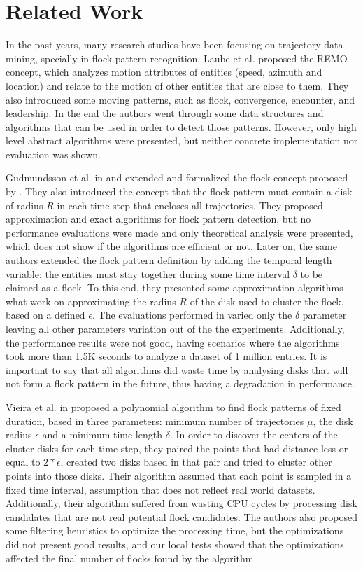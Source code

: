 \chapter{Related Work}
\label{chp:relatedwork}
In the past years, many research studies have been focusing on trajectory data mining, specially in flock pattern
recognition. Laube et al. \cite{bib:remo} proposed the REMO concept, which analyzes motion attributes of entities
(speed, azimuth and location) and relate to the motion of other entities that are close to them. They also introduced
some moving patterns, such as flock, convergence, encounter, and leadership. In the end the authors went through some
data structures and algorithms that can be used in order to detect those patterns. However, only high level abstract
algorithms were presented, but neither concrete implementation nor evaluation was shown.

Gudmundsson et al. in \cite{bib:gudefficient} and \cite{bib:gudlongest} extended and formalized the flock concept
proposed by \cite{bib:remo}. They also introduced the concept that the flock pattern must contain a disk of radius $R$
in each time step that encloses all trajectories. They proposed approximation and exact algorithms for flock pattern
detection, but no performance evaluations were made and only theoretical analysis were presented, which does not show if
the algorithms are efficient or not. Later on, the same authors \cite{bib:gudlongest} extended the flock pattern
definition by adding the temporal length variable: the entities must stay together during some time interval $\delta$ to
be claimed as a flock. To this end, they presented some approximation algorithms what work on approximating the radius
$R$ of the disk used to cluster the flock, based on a defined $\epsilon$. The evaluations performed in
\cite{bib:gudlongest} varied only the $\delta$ parameter leaving all other parameters variation out of the the
experiments. Additionally, the performance results were not good, having scenarios where the algorithms took more than
1.5K seconds to analyze a dataset of 1 million entries. It is important to say that all algorithms did waste time by
analysing disks that will not form a flock pattern in the future, thus having a degradation in performance.

Vieira et al. in \cite{bib:vieira} proposed a polynomial algorithm to find flock patterns of fixed duration, based in
three parameters: minimum number of trajectories $\mu$, the disk radius $\epsilon$ and a minimum time length $\delta$.
In order to discover the centers of the cluster disks for each time step, they paired the points that had distance less
or equal to $2*\epsilon$, created two disks based in that pair and tried to cluster other points into those disks. Their
algorithm assumed that each point is sampled in a fixed time interval, assumption that does not reflect real world
datasets. Additionally, their algorithm suffered from wasting CPU cycles by processing disk candidates that are not real
potential flock candidates. The authors also proposed some filtering heuristics to optimize the processing time, but the
optimizations did not present good results, and our local tests showed that the optimizations affected the final number
of flocks found by the algorithm.

